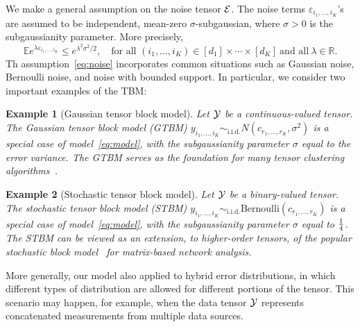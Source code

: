 \documentclass{article}
\newtheorem{exam}{Example}
\begin{document}
We make a general assumption on the noise tensor $\mathcal{E}$. The noise terms $\varepsilon_{i_1,\ldots,i_K}$'s are assumed to be independent, mean-zero $\sigma$-subgaussian, where $\sigma>0$ is the subgaussianity parameter. More precisely, 
\begin{equation}\label{eq:noise}
\mathbb{E}e^{\lambda \varepsilon_{i_1,\ldots,i_K}}\leq e^{\lambda^2\sigma^2/2},\quad \text{for all } (i_1,\ldots,i_K)\in[d_1]\times\cdots\times[d_K] \ \text{and all}\ \lambda\in\mathbb{R}.
\end{equation}
Th assumption~\eqref{eq:noise} incorporates common situations such as Gaussian noise, Bernoulli noise, and noise with bounded support. In particular, we consider two important examples of the TBM:
\vspace{-.1cm}
\begin{exam}[Gaussian tensor block model]
Let $\mathcal{Y}$ be a continuous-valued tensor. The Gaussian tensor block model (GTBM) $y_{i_1,\ldots,i_K}  \sim_{\text{i.i.d.}} N(c_{r_1,\ldots,r_K},\sigma^2)$ is a special case of model~\eqref{eq:model}, with the subgaussianity parameter $\sigma$ equal to the error variance. The GTBM serves as the foundation for many tensor clustering algorithms~\cite{jegelka2009approximation,wang2017three,chi2018provable}. 
\end{exam}
\vspace{-.1cm}
\begin{exam}[Stochastic tensor block model]
Let $\mathcal{Y}$ be a binary-valued tensor. The stochastic tensor block model (STBM) $y_{i_1,\ldots,i_K}  \sim_{\text{i.i.d.}} \text{Bernoulli}(c_{r_1,\ldots,r_K})$ is a special case of model~\eqref{eq:model}, with the subgaussianity parameter $\sigma$ equal to ${1\over 4}$. The STBM can be viewed as an extension, to higher-order tensors, of the popular stochastic block model~\cite{abbe2017community,gao2018minimax} for matrix-based network analysis.
\end{exam}
\vspace{-.1cm}
More generally, our model also applied to hybrid error distributions, in which different types of distribution are allowed for different portions of the tensor. This scenario may happen, for example, when the data tensor $\mathcal{Y}$ represents concatenated measurements from multiple data sources. 
\end{document}
